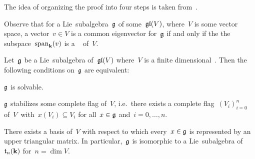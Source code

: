 \begin{remark}
 The idea of organizing the proof into four steps is taken from~\cite[\S 4.1]{Humphreys}.
\end{remark}


\begin{remark}
  Observe that for a Lie~subalgebra~$\glie$ of some~$\mathfrak{gl}(V)$, where~$V$ is some vector space, a vector~$v \in V$ is a common eigenvector for~$\glie$ if and only if the the subspace~$\operatorname{span}_{\mathbf{k}}(v)$ is a {\onedimensional}~{\subrepresentation{$\glie$}} of~$V$.
\end{remark}


\begin{proposition}
  \label{triangularization of solvable linear lie algebras}
  Let~$\glie$ be a Lie~subalgebra of~$\mathfrak{gl}(V)$ where~$V$ is a finite dimensional~{\vectorspace{$\kf$}}.
  Then the following conditions on~$\glie$ are equivalent:
  \begin{equivalenceslist}
    \item
      \label{is solvable}
      $\glie$ is solvable.
    \item
      \label{stabilizes a complete flag}
      $\glie$ stabilizes some complete flag of~$V$, i.e.\ there exists a complete flag~$(V_i)_{i=0}^n$ of~$V$~with~$x(V_i) \subseteq V_i$ for all~$x \in \mathfrak{g}$ and~$i = 0, \dotsc, n$.
    \item
      \label{is triangularizable}
      There exists a basis of~$V$ with respect to which every~$x \in \mathfrak{g}$ is represented by an upper triangular matrix.
      In particular,~$\glie$ is isomorphic to a Lie~subalgebra of~$\mathfrak{t}_n(\mathbf{k})$ for~$n = \dim V$.
  \end{equivalenceslist}
\end{proposition}


